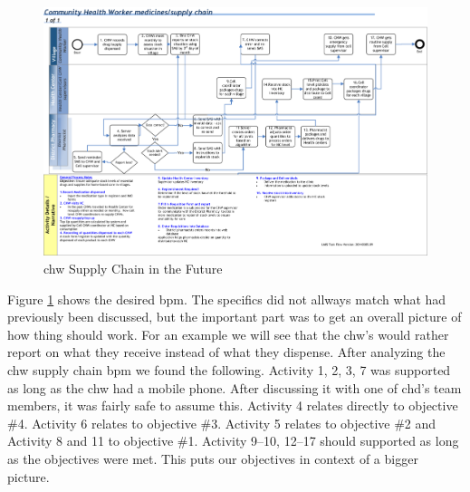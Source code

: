 \begin{figure}
\centering
\includegraphics[width=\textwidth]{case/img/chwSupplyChainFuture}
\caption{\gls{chw} Supply Chain in the Future}
\label{fig:chwSupplyChainFuture}
\end{figure}

Figure \ref{fig:chwSupplyChainFuture} shows the desired \gls{bpm}. The specifics did not allways match what had previously been discussed, but the important part was to get an overall picture of how thing should work. For an example we will see that the \gls{chw}'s would rather report on what they receive instead of what they dispense. After analyzing the \gls{chw} supply chain \gls{bpm} we found the following. 
Activity 1, 2, 3, 7 was supported as long as the \gls{chw} had a mobile phone. After discussing it with one of \gls{chd}'s team members, it was fairly safe to assume this. 
Activity 4 relates directly to objective \#4.
Activity 6 relates to objective \#3. 
Activity 5 relates to objective \#2 and Activity 8 and 11 to objective \#1. Activity 9--10, 12--17 should supported as long as the objectives were met. 
This puts our objectives in context of a bigger picture.

